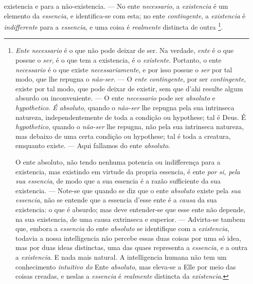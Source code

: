  existencia e para a não-existencia. --- No ente \emph{necessario}, a \emph{existencia} é um elemento da \emph{essencia}, e identifica-se com esta; no ente \emph{contingente}, a \emph{existencia} é \emph{indifferente} para a \emph{essencia}, e uma coisa é \emph{realmente} distincta de outra \footnote{\emph{Ente necessario} é o que não pode deixar de ser. Na verdade, \emph{ente} é o que possue o \emph{ser}, é o que tem a existencia, é o \emph{existente}. Portanto, o ente \emph{necessario} é o que existe \emph{necessariamente}, e por isso possue o \emph{ser} por tal modo, que lhe repugna o \emph{não-ser}. --- O \emph{ente contingente}, por ser \emph{contingente}, existe por tal modo, que pode deixar de existir, sem que d'ahi resulte algum absurdo ou inconveniente. --- O ente \emph{necessario} pode ser \emph{absoluto} e \emph{hypothetico}. \emph{É absoluto}, quando o \emph{não-ser} lhe repugna pela sua intrinseca natureza, independentemente de toda a condição ou hypothese; tal é Deus. É \emph{hypothetico}, quando o \emph{não-ser} lhe repugna, não pela sua intrinseca natureza, mas debaixo de uma certa condição ou hypothese; tal é toda a creatura, emquanto existe. --- Aqui fallamos do ente \emph{absoluto}.\par O ente absoluto, não tendo nenhuma potencia ou indifferença para a existencia, mas existindo em virtude da propria essencia, é ente \emph{por si, pela sua essencia}, de modo que a sua essencia é a razão sufficiente da sua existencia. --- Note-se que quando se diz que o ente \emph{absoluto} existe pela \emph{sua essencia}, não se entende que a essencia d'esse ente é a \emph{causa} da sua existencia: o que é absurdo; mas deve entender-se que esse ente não depende, na sua existencia, de uma causa extrinseca e superior. --- Advirta-se tambem que, embora a \emph{essencia} do ente \emph{absoluto} se identifique com a \emph{existencia}, todavia a nossa intelligencia não percebe essas duas coisas por uma só idea, mas por duas ideas distinctas, uma das quaes representa a \emph{essencia}, e a outra a \emph{existencia}. E nada mais natural. A intelligencia humana não tem um conhecimento \emph{intuitivo do} Ente \emph{absoluto}, mas eleva-se a Elle por meio das coisas creadas, e neslas a \emph{essencia} é \emph{realmente} distincta da \emph{existencia}.}.
